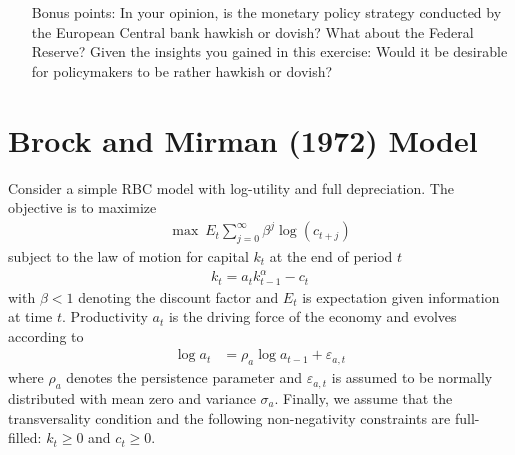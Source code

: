 \documentclass{article}
\begin{document}
\begin{enumerate}
\item[Bonus points:]
In your opinion, is the monetary policy strategy conducted by the European Central bank hawkish or dovish?
What about the Federal Reserve?
Given the insights you gained in this exercise:
Would it be desirable for policymakers to be rather hawkish or dovish?

\end{enumerate}


\newpage

\section[Brock and Mirman (1972) Model]{Brock and Mirman (1972) Model\label{ex:BrockMirman}}
Consider a simple RBC model with log-utility and full depreciation.
The objective is to maximize
\begin{align*}
\max~E_t \sum_{j=0}^{\infty} \beta^{j} \log(c_{t+j})
\end{align*}
subject to the law of motion for capital \(k_t\) at the end of period \(t\)
\begin{align}
k_{t} = a_t k_{t-1}^\alpha - c_t \label{eq:BrockMirmanCapital}
\end{align}
with \(\beta <1\) denoting the discount factor and \(E_t\) is expectation given information at time \(t\).
Productivity \(a_t\) is the driving force of the economy and evolves according to
\begin{align}
\log{a_{t}} &= \rho_a \log{a_{t-1}}  + \varepsilon_{a,t} \label{eq:BrockMirmanTFP}
\end{align}
where \(\rho_a\) denotes the persistence parameter
  and \(\varepsilon_{a,t}\) is assumed to be normally distributed with mean zero and variance \(\sigma_a\).
Finally, we assume that the transversality condition and 
  the following non-negativity constraints are full-filled: \(k_t \geq0\) and \(c_t \geq 0\).
\end{document}

